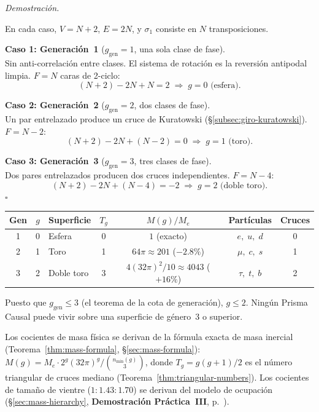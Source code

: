\documentclass[11pt, a4paper, openany]{book}
\renewenvironment{proof}[1][Demostraci\'on]{%
  \par\noindent\textit{#1.}\quad
}{\hfill$\square$\par\medskip}
\begin{document}
\begin{proof}
En cada caso, $V = N + 2$, $E = 2N$, y $\sigma_1$ consiste en $N$
transposiciones.

\medskip\noindent
\textbf{Caso 1: Generación~1} ($g_{\mathrm{gen}} = 1$, una sola clase
de fase).\\
Sin anti-correlación entre clases. El sistema de rotación es la
reversión antipodal limpia. $F = N$ caras de 2-ciclo:
\[
  (N+2) - 2N + N = 2 \;\Longrightarrow\; g = 0 \text{ (esfera).}
\]

\medskip\noindent
\textbf{Caso 2: Generación~2} ($g_{\mathrm{gen}} = 2$, dos clases de
fase).\\
Un par entrelazado produce un cruce de Kuratowski
(\S\ref{subsec:giro-kuratowski}). $F = N - 2$:
\[
  (N+2) - 2N + (N-2) = 0 \;\Longrightarrow\; g = 1 \text{ (toro).}
\]

\medskip\noindent
\textbf{Caso 3: Generación~3} ($g_{\mathrm{gen}} = 3$, tres clases de
fase).\\
Dos pares entrelazados producen dos cruces independientes. $F = N - 4$:
\[
  (N+2) - 2N + (N-4) = -2 \;\Longrightarrow\; g = 2
  \text{ (doble toro).}
\]
\end{proof}

\medskip
\begin{center}
\renewcommand{\arraystretch}{1.2}
\begin{tabular}{cclcccc}
\toprule
Gen & $g$ & Superficie & $T_g$ & $M(g)/M_e$
  & Part\'iculas & Cruces \\
\midrule
1 & 0 & Esfera      & 0 & $1$ (exacto)
  & $e,\; u,\; d$ & 0 \\
2 & 1 & Toro        & 1 & $64\pi \approx 201$ ($-2{.}8\%$)
  & $\mu,\; c,\; s$ & 1 \\
3 & 2 & Doble toro  & 3 & $4(32\pi)^2/10 \approx 4043$ ($+16\%$)
  & $\tau,\; t,\; b$ & 2 \\
\bottomrule
\end{tabular}
\end{center}

\medskip
\noindent
Puesto que $g_{\mathrm{gen}} \le 3$ (el teorema de la cota de
generaci\'on), $g \le 2$. Ning\'un Prisma Causal puede vivir sobre una
superficie de g\'enero~3 o superior.

Los cocientes de masa f\'isica se derivan de la f\'ormula exacta de
masa inercial (Teorema~\ref{thm:mass-formula},
\S\ref{sec:mass-formula}):
$M(g) = M_e \cdot 2^g (32\pi)^g / \binom{n_{\min}(g)}{3}$, donde
$T_g = g(g+1)/2$ es el n\'umero triangular de cruces mediano
(Teorema~\ref{thm:triangular-numbers}). Los cocientes de tama\~no de
vientre ($1 : 1{.}43 : 1{.}70$) se derivan del modelo de ocupaci\'on
(\S\ref{sec:mass-hierarchy},
\textbf{Demostraci\'on Pr\'actica~III},
p.~\pageref{sec:demo-mass}).
\end{document}
